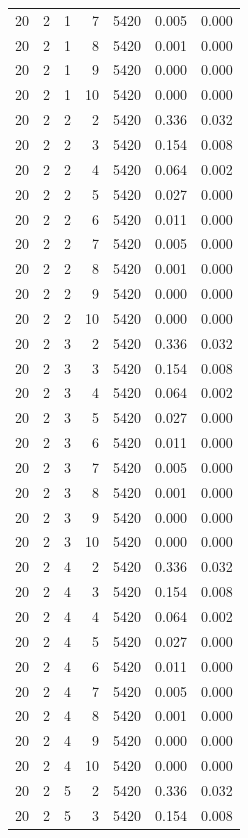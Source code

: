 \begin{table}
\begin{tabular}{rrrrrrr}
20 & 2 & 1 & 7 & 5420 & 0.005 & 0.000 \\
20 & 2 & 1 & 8 & 5420 & 0.001 & 0.000 \\
20 & 2 & 1 & 9 & 5420 & 0.000 & 0.000 \\
20 & 2 & 1 & 10 & 5420 & 0.000 & 0.000 \\
20 & 2 & 2 & 2 & 5420 & 0.336 & 0.032 \\
20 & 2 & 2 & 3 & 5420 & 0.154 & 0.008 \\
20 & 2 & 2 & 4 & 5420 & 0.064 & 0.002 \\
20 & 2 & 2 & 5 & 5420 & 0.027 & 0.000 \\
20 & 2 & 2 & 6 & 5420 & 0.011 & 0.000 \\
20 & 2 & 2 & 7 & 5420 & 0.005 & 0.000 \\
20 & 2 & 2 & 8 & 5420 & 0.001 & 0.000 \\
20 & 2 & 2 & 9 & 5420 & 0.000 & 0.000 \\
20 & 2 & 2 & 10 & 5420 & 0.000 & 0.000 \\
20 & 2 & 3 & 2 & 5420 & 0.336 & 0.032 \\
20 & 2 & 3 & 3 & 5420 & 0.154 & 0.008 \\
20 & 2 & 3 & 4 & 5420 & 0.064 & 0.002 \\
20 & 2 & 3 & 5 & 5420 & 0.027 & 0.000 \\
20 & 2 & 3 & 6 & 5420 & 0.011 & 0.000 \\
20 & 2 & 3 & 7 & 5420 & 0.005 & 0.000 \\
20 & 2 & 3 & 8 & 5420 & 0.001 & 0.000 \\
20 & 2 & 3 & 9 & 5420 & 0.000 & 0.000 \\
20 & 2 & 3 & 10 & 5420 & 0.000 & 0.000 \\
20 & 2 & 4 & 2 & 5420 & 0.336 & 0.032 \\
20 & 2 & 4 & 3 & 5420 & 0.154 & 0.008 \\
20 & 2 & 4 & 4 & 5420 & 0.064 & 0.002 \\
20 & 2 & 4 & 5 & 5420 & 0.027 & 0.000 \\
20 & 2 & 4 & 6 & 5420 & 0.011 & 0.000 \\
20 & 2 & 4 & 7 & 5420 & 0.005 & 0.000 \\
20 & 2 & 4 & 8 & 5420 & 0.001 & 0.000 \\
20 & 2 & 4 & 9 & 5420 & 0.000 & 0.000 \\
20 & 2 & 4 & 10 & 5420 & 0.000 & 0.000 \\
20 & 2 & 5 & 2 & 5420 & 0.336 & 0.032 \\
20 & 2 & 5 & 3 & 5420 & 0.154 & 0.008 \\

\end{tabular}
\end{table}
